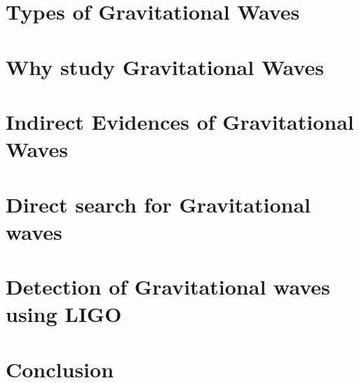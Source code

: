 \documentclass[11pt, a4paper]{article}
\begin{document}
\section{Types of Gravitational Waves}


\section{Why study Gravitational Waves}


\section{Indirect Evidences of Gravitational Waves}


\section{Direct search for Gravitational waves}







\section{Detection of Gravitational waves using LIGO }



\section{Conclusion}




\printbibliography
\end{document}
